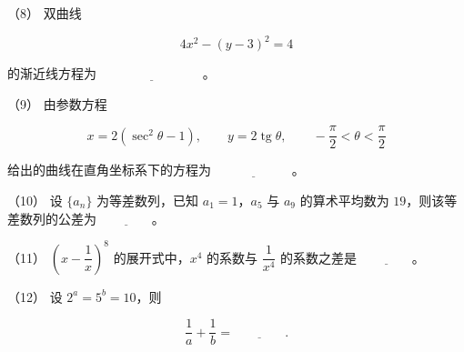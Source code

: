\begin{question}
（8） 双曲线

\nopagebreak[4]
\[
4x^2-(y-3)^2=4
\]

的渐近线方程为 $\underline{\hspace{8em}}$。

（9） 由参数方程

\nopagebreak[4]
\[
x=2(\sec^2\theta-1),\qquad y=2\operatorname{tg}\theta,
\qquad -\frac\pi2<\theta<\frac\pi2
\]

给出的曲线在直角坐标系下的方程为 $\underline{\hspace{6em}}$。

（10） 设 $\{a_n\}$ 为等差数列，已知 $a_1=1$，$a_5$ 与 $a_9$ 的算术平均数为 $19$，则该等差数列的公差为 $\underline{\hspace{4em}}$。

（11） $\left(x-\dfrac1x\right)^8$ 的展开式中，$x^4$ 的系数与 $\dfrac1{x^4}$ 的系数之差是 $\underline{\hspace{4em}}$。

（12） 设 $2^a=5^b=10$，则

\nopagebreak[4]
\[
\frac1a+\frac1b=\underline{\hspace{4em}}.
\]

\Needspace{0.4\textheight}
\end{question}
